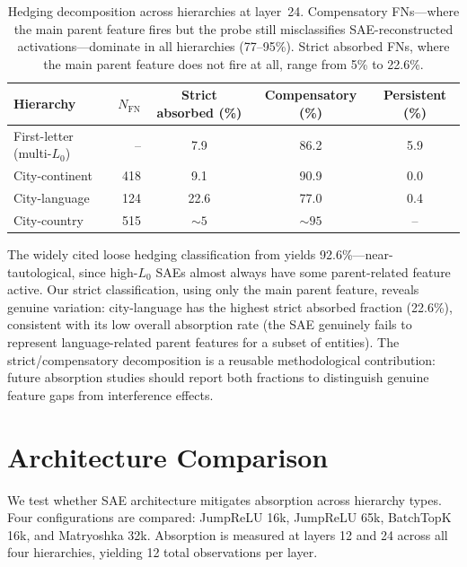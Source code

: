 \documentclass{article}
\begin{document}
\begin{table}[t]
\caption{Hedging decomposition across hierarchies at layer~24. Compensatory FNs---where the main parent feature fires but the probe still misclassifies SAE-reconstructed activations---dominate in all hierarchies (77--95\%). Strict absorbed FNs, where the main parent feature does not fire at all, range from 5\% to 22.6\%.}
\label{tab:hedging}
\centering
\begin{tabular}{lrccc}
\toprule
Hierarchy & $N_{\text{FN}}$ & Strict absorbed (\%) & Compensatory (\%) & Persistent (\%) \\
\midrule
First-letter (multi-$L_0$) & -- & 7.9  & 86.2 & 5.9 \\
City-continent             & 418 & 9.1  & 90.9 & 0.0 \\
City-language              & 124 & 22.6 & 77.0 & 0.4 \\
City-country               & 515 & ${\sim}5$  & ${\sim}95$ & -- \\
\bottomrule
\end{tabular}
\end{table}

The widely cited loose hedging classification from \citet{chanin2024absorption} yields 92.6\%---near-tautological, since high-$L_0$ SAEs almost always have some parent-related feature active. Our strict classification, using only the main parent feature, reveals genuine variation: city-language has the highest strict absorbed fraction (22.6\%), consistent with its low overall absorption rate (the SAE genuinely fails to represent language-related parent features for a subset of entities). The strict/compensatory decomposition is a reusable methodological contribution: future absorption studies should report both fractions to distinguish genuine feature gaps from interference effects.

\section{Architecture Comparison}
\label{sec:architecture}

We test whether SAE architecture mitigates absorption across hierarchy types. Four configurations are compared: JumpReLU 16k, JumpReLU 65k, BatchTopK 16k, and Matryoshka 32k. Absorption is measured at layers 12 and 24 across all four hierarchies, yielding 12 total observations per layer.
\end{document}

